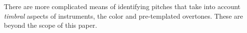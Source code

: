 There are more complicated means of identifying pitches that take into account \textit{timbral} aspects of instruments, the color and pre-templated overtones. These are beyond the scope of this paper.